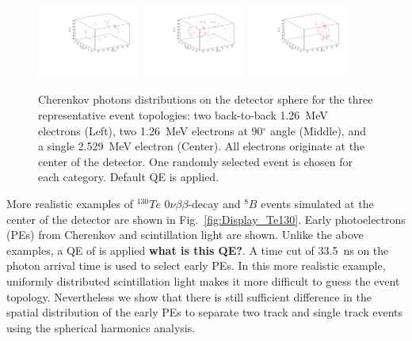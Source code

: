 \documentclass[12pt,twoside,letterpaper]{article}
\newcommand{\vbb}{0\nu\beta\beta}
\newcommand{\Te}{^{130}Te}
\newcommand{\B}{^{8}B}
\begin{document}
\begin{figure}[htb]
\centering
\includegraphics[angle=0,width=0.3\textwidth]{plots/hDisplay_topology180_2p529MeVTot}
\includegraphics[angle=0,width=0.3\textwidth]{plots/hDisplay_topology90_2p529MeVTot}
\includegraphics[angle=0,width=0.3\textwidth]{plots/hDisplay_1el_2p529MeV}
\caption{Cherenkov photons distributions on the detector sphere for the three representative event topologies: two back-to-back 1.26~MeV electrons (Left), two 1.26~MeV electrons at 90$^{\circ}$ angle (Middle), and a single 2.529~MeV electron (Center).  All electrons originate at the center of the detector. One randomly selected event is chosen for each category. Default QE is applied.}
\label{fig:Display_top_2p5MeV}
\end{figure}

More realistic examples of $\Te$ $\vbb$-decay and $\B$ events simulated at the center of the detector are shown in Fig.~\ref{fig:Display_Te130}. Early photoelectrons (PEs) from Cherenkov and scintillation light are shown. Unlike the above examples, a QE of is applied {\bf what is this QE?}.  A time cut of 33.5~ns on the photon arrival time is used to select early PEs. In this more realistic example, uniformly distributed scintillation light makes it more difficult to guess the event topology. Nevertheless we show that there is still sufficient difference in the spatial distribution of the early PEs to separate two track and single track events using the spherical harmonics analysis.
\end{document}
